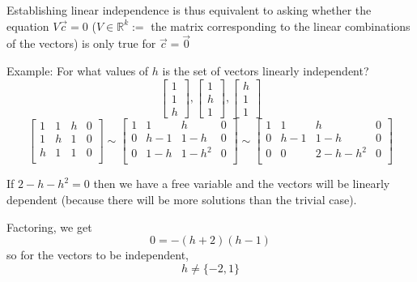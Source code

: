 \documentclass[12pt]{article} %
\newcommand{\R}{\mathbb{R}}
\begin{document}
Establishing linear independence is thus equivalent to asking whether the equation $V\vec{c} = 0$ ($V \in \R^k :=$ the matrix corresponding to the linear combinations of the vectors) is only true for $\vec{c} = \vec{0}$

Example: For what values of $h$ is the set of vectors linearly independent? 
$$
	\begin{bmatrix}
		1\\1\\h
	\end{bmatrix}, 
	\begin{bmatrix}
		1\\h\\1
	\end{bmatrix}, 
	\begin{bmatrix}
		h\\1\\1
	\end{bmatrix}
$$
$$
\begin{bmatrix}
	1 & 1 & h & 0\\
	1 & h & 1 & 0\\
	h & 1 & 1 & 0\\
\end{bmatrix} \sim 
\begin{bmatrix}
	1 & 1 & h & 0\\
	0 & h - 1 & 1 - h & 0\\
	0 & 1 - h & 1 - h^2 & 0\\
\end{bmatrix} \sim 
\begin{bmatrix}
	1 & 1 & h & 0\\
	0 & h - 1 & 1 - h & 0\\
	0 & 0 & 2 - h - h^2 & 0\\
\end{bmatrix}
$$

If $2 - h - h^2 = 0$ then we have a free variable and the vectors will be linearly dependent (because there will be more solutions than the trivial case).

Factoring, we get 
$$0 = -(h + 2)(h - 1)$$
so for the vectors to be independent, 
$$h \neq \{-2, 1\}$$
\end{document}
